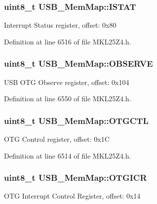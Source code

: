 \subsubsection[{\texorpdfstring{I\+S\+T\+AT}{ISTAT}}]{\setlength{\rightskip}{0pt plus 5cm}uint8\+\_\+t U\+S\+B\+\_\+\+Mem\+Map\+::\+I\+S\+T\+AT}\hypertarget{struct_u_s_b___mem_map_aa88345921ba963631cba089504b96c19}{}\label{struct_u_s_b___mem_map_aa88345921ba963631cba089504b96c19}
Interrupt Status register, offset\+: 0x80 

Definition at line 6516 of file M\+K\+L25\+Z4.\+h.

\subsubsection[{\texorpdfstring{O\+B\+S\+E\+R\+VE}{OBSERVE}}]{\setlength{\rightskip}{0pt plus 5cm}uint8\+\_\+t U\+S\+B\+\_\+\+Mem\+Map\+::\+O\+B\+S\+E\+R\+VE}\hypertarget{struct_u_s_b___mem_map_a1bf837fd42e907a712c9f8e7261ea10d}{}\label{struct_u_s_b___mem_map_a1bf837fd42e907a712c9f8e7261ea10d}
U\+SB O\+TG Observe register, offset\+: 0x104 

Definition at line 6550 of file M\+K\+L25\+Z4.\+h.

\subsubsection[{\texorpdfstring{O\+T\+G\+C\+TL}{OTGCTL}}]{\setlength{\rightskip}{0pt plus 5cm}uint8\+\_\+t U\+S\+B\+\_\+\+Mem\+Map\+::\+O\+T\+G\+C\+TL}\hypertarget{struct_u_s_b___mem_map_a615eaa9b0200d66323e8ee2650a49164}{}\label{struct_u_s_b___mem_map_a615eaa9b0200d66323e8ee2650a49164}
O\+TG Control register, offset\+: 0x1C 

Definition at line 6514 of file M\+K\+L25\+Z4.\+h.

\subsubsection[{\texorpdfstring{O\+T\+G\+I\+CR}{OTGICR}}]{\setlength{\rightskip}{0pt plus 5cm}uint8\+\_\+t U\+S\+B\+\_\+\+Mem\+Map\+::\+O\+T\+G\+I\+CR}\hypertarget{struct_u_s_b___mem_map_a4cd829d73e01b3cf0a4fa9affedb210f}{}\label{struct_u_s_b___mem_map_a4cd829d73e01b3cf0a4fa9affedb210f}
O\+TG Interrupt Control Register, offset\+: 0x14 

